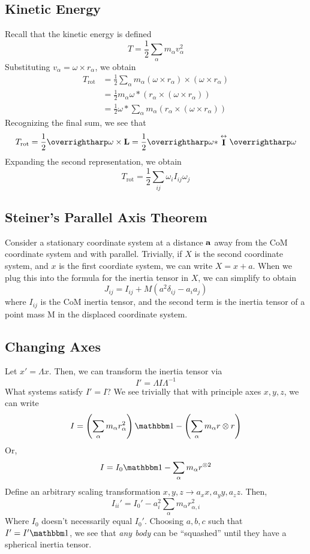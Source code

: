 \subsection{Kinetic Energy}
Recall that the kinetic energy is defined
\[T = \frac{1}{2}\sum_{\alpha}m_\alpha v_\alpha^2\]
Substituting \(v_\alpha = \omega\times r_\alpha\), we obtain
\begin{align*}
	T_{\text{rot}} &= \frac{1}{2}\sum_\alpha m_\alpha (\omega\times r_\alpha)\times (\omega\times r_\alpha)\\
		       &=\frac{1}{2}m_\alpha\omega*(r_\alpha\times(\omega\times r_\alpha))\\
		       &=\frac{1}{2}\omega*\sum_\alpha m_\alpha (r_\alpha\times (\omega\times r_\alpha))
\end{align*}
Recognizing the final sum, we see that 
\begin{equation}
	T_{\text{rot}} = \frac{1}{2} \vv\omega \times \vb L = \frac{1}{2}\vv\omega * \stackrel{\leftrightarrow}{\vb I}\vv\omega
\end{equation}
Expanding the second representation, we obtain
\begin{equation}
	T_{\text{rot}} = \frac{1}{2}\sum_{ij} \omega_iI_{ij}\omega_j
\end{equation}

\subsection{Steiner's Parallel Axis Theorem}
Consider a stationary coordinate system at a distance \(\mathbf{a}\) away from the CoM coordinate system and with parallel. Trivially, if \(X\) is the second coordinate system, and \(x\) is the first coordiate system, we can write \(X=x+a\). When we plug this into the formula for the inertia tensor in \(X\), we can simplify to obtain
\begin{equation}
	J_{ij} = I_{ij} + M(a^2\delta_{ij}-a_ia_j)
\end{equation}
where \(I_{ij}\) is the CoM inertia tensor, and the second term is the inertia tensor of a point mass M in the displaced coordinate system.

\subsection{Changing Axes}
Let \(x' = \Lambda x\). Then, we can transform the inertia tensor via
\[I' = \Lambda I \Lambda^{-1}\]
What systems satisfy \(I' = I\)? We see trivially that with principle axes \(x,y,z\), we can write
\[I = \left(\sum_{\alpha}m_\alpha r_\alpha^2\right)\mathbbm 1 - \left(\sum_\alpha m_\alpha r\tp r\right)\]
Or,
\[I =I_0 \mathbbm 1 - \sum_\alpha m_\alpha r^{\tp 2}\]
Define an arbitrary scaling transformation \(x,y,z\to a_xx, a_yy, a_zz\). Then,
\[I_{ii}' = I_0' - a_i^2\sum_\alpha m_\alpha r_{\alpha,i}^2\]
Where \(I_0\) doesn't necessarily equal \(I_0'\). Choosing \(a,b,c\) such that \(I' = I'\mathbbm 1\), we see that \emph{any body} can be ``squashed'' until they have a spherical inertia tensor.

